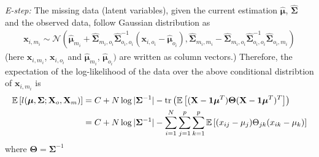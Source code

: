 \begin{exercise}
  \begin{exerciseSection}
    \emph{E-step:} The missing data (latent variables), given the current
    estimation $\hat{\bm{\mu}}$, $\hat{\mathbf{\Sigma}}$ and the observed data,
    follow Gaussian distribution as
    \begin{align}
      \mathbf{x}_{i, m_i}\sim\mathcal{N}\left(\hat{\bm{\mu}}_{m_i} +
     \hat{\mathbf{\Sigma}}_{m_i, o_i} \hat{\mathbf{\Sigma}}_{o_i,
      o_i}^{-1} (\mathbf{x}_{i, o_i} - \hat{\bm{\mu}}_{o_i}),
      \hat{\mathbf{\Sigma}}_{m_i, m_i} - \hat{\mathbf{\Sigma}}_{m_i, o_i}
      \hat{\mathbf{\Sigma}}_{o_i, o_i}^{-1} \hat{\mathbf{\Sigma}}_{o_i, m_i}
      \right)
    \end{align}
    (here $\mathbf{x}_{i, m_i}$, $\mathbf{x}_{i, o_i}$ and
    $\hat{\bm{\mu}}_{m_i}$, $\hat{\bm{\mu}}_{o_i})$ are written as column
    vectors.) Therefore, the expectation of the log-likelihood of the data
    over the above conditional distribtion of $\mathbf{x}_{i, m_i}$ is
    \begin{align}
      \mathbb{E}\left[l(\bm{\mu}, \mathbf{\Sigma}; \mathbf{X}_o,
      \mathbf{X}_m)\right] & = C+ N\log|\mathbf{\Sigma}^{-1}| -
      \tr\left(\mathbb{E}\left[(\mathbf{X} - \mathbf{1}\bm{\mu}^T)
      \mathbf{\Theta} (\mathbf{X} - \mathbf{1}\bm{\mu}^T)^T \right] \right)
      \notag
      \\
      &=  C+ N\log|\mathbf{\Sigma}^{-1}|-
      \sum_{i=1}^N
      \sum_{j=1}^p \sum_{k=1}^p\mathbb{E}\left[(x_{ij} - \mu_j)\Theta_{jk}
      (x_{ik} - \mu_k) \right]
    \end{align}
    where $\mathbf{\Theta} = \mathbf{\Sigma}^{-1}$
        

\end{exerciseSection}
\end{exercise}
